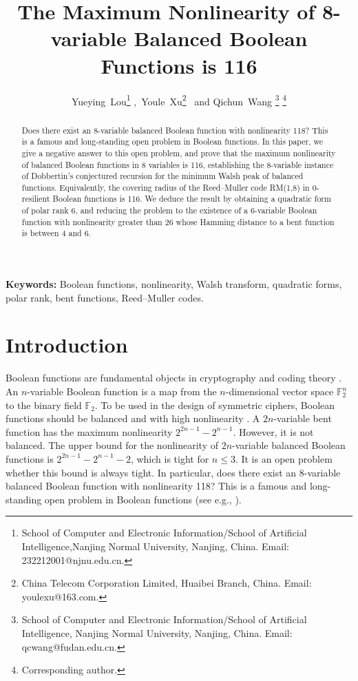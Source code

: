 \documentclass[11pt]{article}
\date{}
\title{The Maximum Nonlinearity of 8-variable Balanced Boolean Functions is 116}
\author{ Yueying~Lou\footnote{School of Computer and Electronic Information/School of Artificial Intelligence,Nanjing Normal University, Nanjing, China. Email: 232212001@njnu.edu.cn.
} ,\ Youle~Xu\footnote{China Telecom Corporation Limited, Huaibei Branch, China. Email: youlexu@163.com.} \ and Qichun~Wang \footnote{School of Computer and Electronic Information/School of Artificial Intelligence,
Nanjing Normal University, Nanjing, China.
 Email: qcwang@fudan.edu.cn.} \footnote{Corresponding author.}}
\newtheorem{open problem}{Open problem}
\begin{document}
\maketitle
\begin{abstract}
Does there exist an 8-variable balanced Boolean function with nonlinearity 118? This is a famous and long-standing open problem in Boolean functions. In this paper, we give a negative answer to this open problem, and prove that the maximum nonlinearity of balanced Boolean functions in 8 variables
is 116, establishing the 8-variable instance of Dobbertin's conjectured recursion for the minimum Walsh peak of balanced functions. Equivalently, the covering radius of the Reed--Muller code RM(1,8) in 0-resilient Boolean functions is 116.
We deduce the result by obtaining a quadratic form of polar rank 6, and reducing the problem to the existence of a 6-variable Boolean function with nonlinearity greater than 26 whose Hamming distance to a bent function is between 4 and 6.

\end{abstract}


\par {\bf Keywords:}  Boolean functions, nonlinearity, Walsh transform, quadratic forms, polar rank, bent functions, Reed--Muller codes.




\section{Introduction}

Boolean functions are fundamental objects in cryptography and coding theory \cite{Car,Logachev}. An $n$-variable Boolean function is a map from the $n$-dimensional vector space $\mathbb{F}_{2}^{n}$ to the binary field $\mathbb{F}_{2}$.
To be used in the design of symmetric ciphers, Boolean functions should be balanced and with high nonlinearity \cite{Cusick}. A $2n$-variable bent function has the maximum nonlinearity $2^{2n-1}-2^{n-1}$. However, it is not balanced.
The upper bound for the nonlinearity of $2n$-variable balanced Boolean functions is $2^{2n-1}-2^{n-1}-2$, which is tight for $n\le 3$. It is an open problem whether this bound is always tight. In particular, does there exist an 8-variable balanced Boolean function with nonlinearity 118? This is a famous and long-standing open problem in Boolean functions (see e.g., \cite{Car,Car0,Djurasevic,Maitra,Picek}).
\end{document}

